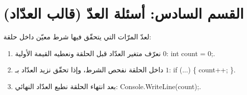 \documentclass[14pt]{extarticle}
\begin{document}
\section*{القسم السادس: أسئلة العدّ (قالب العدّاد)}

\begin{boxNote}
لعدّ المرّات التي يتحقّق فيها شرط معيّن داخل حلقة:
\begin{enumerate}[nosep]
    \item نعرّف متغير العدّاد قبل الحلقة ونعطيه القيمة الأولية $0$: \textenglish{int count = 0;}.
    \item داخل الحلقة نفحص الشرط، وإذا تحقّق نزيد العدّاد بـ $1$: \textenglish{if (...) \{ count++; \}}.
    \item بعد انتهاء الحلقة نطبع العدّاد النهائي: \textenglish{Console.WriteLine(count);}.
\end{enumerate}
\end{boxNote}
\end{document}
